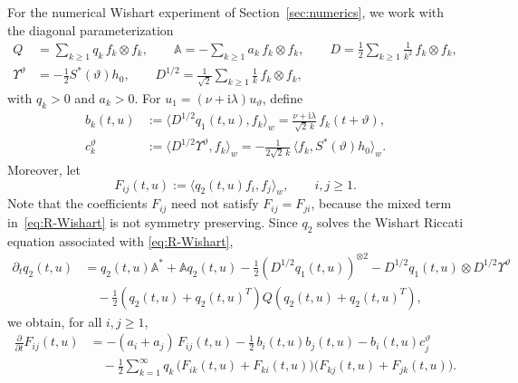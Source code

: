 \documentclass[10pt,a4paper,reqno]{amsart}
\numberwithin{equation}{section}
\theoremstyle{plain}
\theoremstyle{definition}
\theoremstyle{example}
\begin{document}
For the numerical Wishart experiment of Section~\ref{sec:numerics}, we work with the diagonal parameterization
\begin{align*}
Q &= \sum_{k\ge1} q_k\, f_k\otimes f_k,\qquad
\mathbb{A} = -\sum_{k\ge1} a_k\, f_k\otimes f_k,\qquad
D = \frac{1}{2}\sum_{k\ge1}\frac{1}{k^2}\,f_k\otimes f_k,\\
\Upsilon^\vartheta &= -\tfrac12 S^*(\vartheta)h_0,\qquad
D^{1/2}=\frac{1}{\sqrt2}\sum_{k\ge1}\frac{1}{k}\,f_k\otimes f_k,
\end{align*}
with $q_k>0$ and $a_k>0$. For $u_1=(\nu+\mathrm{i}\lambda)u_\vartheta$, define
\begin{align*}
b_k(t,u) &:= \langle D^{1/2}q_1(t,u),f_k\rangle_w
        = \frac{\nu+\mathrm{i}\lambda}{\sqrt2\,k}\,f_k(t+\vartheta),\\
c_k^\vartheta &:= \langle D^{1/2}\Upsilon^\vartheta,f_k\rangle_w
        = -\frac{1}{2\sqrt2\,k}\,\langle f_k,S^*(\vartheta)h_0\rangle_w.
\end{align*}
Moreover, let
\begin{equation*}
F_{ij}(t,u):=\langle q_2(t,u)f_i,f_j\rangle_w,\qquad i,j\ge1.
\end{equation*}
Note that the coefficients $F_{ij}$ need not satisfy $F_{ij}=F_{ji}$, because the mixed term in~\eqref{eq:R-Wishart} is not symmetry preserving.
Since $q_2$ solves the Wishart Riccati equation associated with \eqref{eq:R-Wishart},
\begin{align*}
\partial_t q_2(t,u)
&= q_2(t,u)\mathbb{A}^*+\mathbb{A}q_2(t,u)
   -\tfrac12(D^{1/2}q_1(t,u))^{\otimes2}
   -D^{1/2}q_1(t,u)\otimes D^{1/2}\Upsilon^\vartheta \\
&\quad -\tfrac12(q_2(t,u)+q_2(t,u)^T)Q(q_2(t,u)+q_2(t,u)^T),
\end{align*}
we obtain, for all $i,j\ge1$,
\begin{equation}\label{eq:q_2_prod_infty}
\begin{aligned}
\frac{\partial}{\partial t}F_{ij}(t,u)
&= -(a_i+a_j)\,F_{ij}(t,u)
   -\frac12\, b_i(t,u)b_j(t,u)
   - b_i(t,u)c_j^\vartheta \\
&\quad -\frac12\sum_{k=1}^\infty q_k\,
   \big(F_{ik}(t,u)+F_{ki}(t,u)\big)\big(F_{kj}(t,u)+F_{jk}(t,u)\big).
\end{aligned}
\end{equation}
\end{document}
